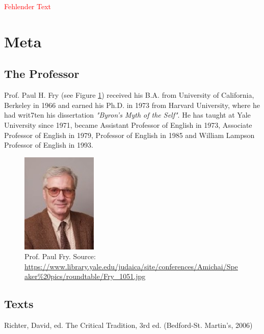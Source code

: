 \documentclass[]{scrartcl}
\begin{document}
\textcolor{red}{Fehlender Text}


\newpage
\section{Meta}
\subsection{The Professor}
Prof. Paul H. Fry (see Figure \ref{fig:paul_fry}) received his B.A. from University of California, Berkeley in 1966 and earned his Ph.D. in 1973 from Harvard University, where he had writ7ten his dissertation \emph{"Byron’s Myth of the Self"}. He has taught at Yale University since 1971, became Assistant Professor of English in 1973, Associate Professor of English in 1979, Professor of English in 1985 and William Lampson Professor of English in 1993.

\begin{figure}[]
	\centering
	\includegraphics[width=0.32\textwidth]{images/paul_fry.jpg}
	\caption{Prof. Paul Fry. Source: \url{https://www.library.yale.edu/judaica/site/conferences/Amichai/Speaker\%20pics/roundtable/Fry_1051.jpg}}
	\label{fig:paul_fry}
\end{figure}

\subsection{Texts}

Richter, David, ed. The Critical Tradition, 3rd ed. (Bedford-St. Martin's, 2006)
\end{document}
